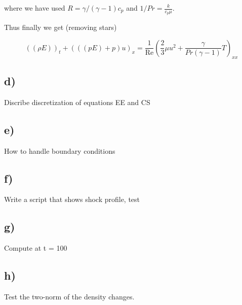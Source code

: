 \documentclass{article}
\renewcommand{\Re}{\text{Re}}
\begin{document}
where we have used $ R = \gamma/(\gamma-1) c_p$ and $1/Pr = \frac{k}{c_p \mu}$.

Thus finally we get (removing stars) 

\begin{equation}
 ((\rho E))_{t} +  ( ((pE)+p)u  )_{x} = \frac{1}{\Re} (\frac{2}{3}\mu  u^2 + \frac{\gamma}{Pr (\gamma-1)} T)_{xx}
\end{equation}

\subsection{d)}
Discribe discretization of equations EE and CS

\subsection{e)}
How to handle boundary conditions

\subsection{f)}
Write a script that shows shock profile, test

\subsection{g)}
Compute at t = 100

\subsection{h)}
Test the two-norm of the density changes.
\end{document}

